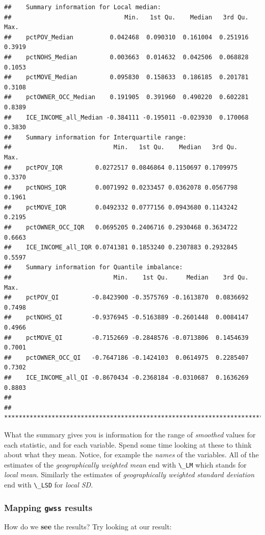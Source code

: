 \documentclass[
]{book}
\newcommand{\passthrough}[1]{#1}
\begin{document}
\begin{lstlisting}
##    Summary information for Local median:
##                               Min.   1st Qu.    Median   3rd Qu.   Max.
##    pctPOV_Median          0.042468  0.090310  0.161004  0.251916 0.3919
##    pctNOHS_Median         0.003663  0.014632  0.042506  0.068828 0.1053
##    pctMOVE_Median         0.095830  0.158633  0.186185  0.201781 0.3108
##    pctOWNER_OCC_Median    0.191905  0.391960  0.490220  0.602281 0.8389
##    ICE_INCOME_all_Median -0.384111 -0.195011 -0.023930  0.170068 0.3830
##    Summary information for Interquartile range:
##                            Min.   1st Qu.    Median   3rd Qu.   Max.
##    pctPOV_IQR         0.0272517 0.0846864 0.1150697 0.1709975 0.3370
##    pctNOHS_IQR        0.0071992 0.0233457 0.0362078 0.0567798 0.1961
##    pctMOVE_IQR        0.0492332 0.0777156 0.0943680 0.1143242 0.2195
##    pctOWNER_OCC_IQR   0.0695205 0.2406716 0.2930468 0.3634722 0.6663
##    ICE_INCOME_all_IQR 0.0741381 0.1853240 0.2307883 0.2932845 0.5597
##    Summary information for Quantile imbalance:
##                            Min.    1st Qu.     Median    3rd Qu.   Max.
##    pctPOV_QI         -0.8423900 -0.3575769 -0.1613870  0.0836692 0.7498
##    pctNOHS_QI        -0.9376945 -0.5163889 -0.2601448  0.0084147 0.4966
##    pctMOVE_QI        -0.7152669 -0.2848576 -0.0713806  0.1454639 0.7001
##    pctOWNER_OCC_QI   -0.7647186 -0.1424103  0.0614975  0.2285407 0.7302
##    ICE_INCOME_all_QI -0.8670434 -0.2368184 -0.0310687  0.1636269 0.8803
## 
##    ************************************************************************
\end{lstlisting}

What the summary gives you is information for the range of \emph{smoothed} values for each statistic, and for each variable. Spend some time looking at these to think about what they mean. Notice, for example the \emph{names} of the variables. All of the estimates of the \emph{geographically weighted mean} end with \passthrough{\lstinline!\_LM!} which stands for \emph{local mean}. Similarly the estimates of \emph{geographically weighted standard deviation} end with \passthrough{\lstinline!\_LSD!} for \emph{local SD}.

\hypertarget{mapping-gwss-results}{%
\subsubsection{\texorpdfstring{Mapping \texttt{gwss} results}{Mapping gwss results}}\label{mapping-gwss-results}}

How do we \textbf{see} the results? Try looking at our result:
\end{document}
